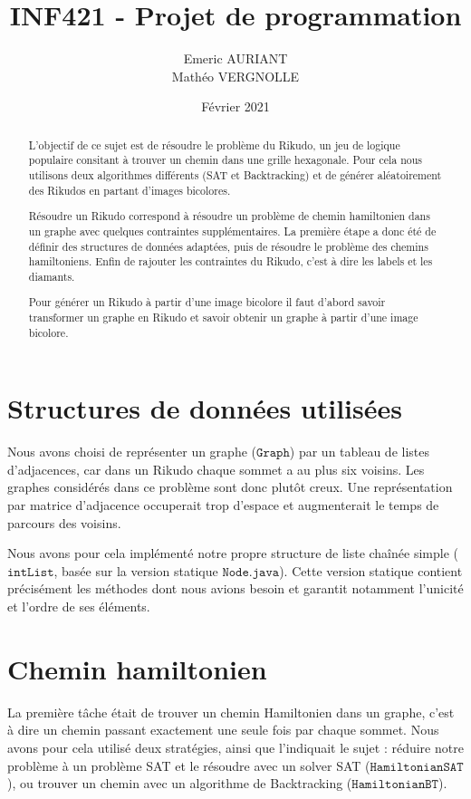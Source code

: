 \documentclass[11pt, a4paper]{article}
\author{Emeric \textsc{AURIANT} \\ Mathéo \textsc{VERGNOLLE}}
\title{INF421 - Projet de programmation}
\date{Février 2021}
\begin{document}
	
\maketitle

\begin{abstract}
	
L'objectif de ce sujet est de résoudre le problème du Rikudo, un jeu de logique populaire consitant à trouver un chemin dans une grille hexagonale. Pour cela nous utilisons deux algorithmes différents (SAT et Backtracking) et de générer aléatoirement des Rikudos en partant d'images bicolores. 

Résoudre un Rikudo correspond à résoudre un problème de chemin hamiltonien dans un graphe avec quelques contraintes supplémentaires. La première étape a donc été de définir des structures de données adaptées, puis de résoudre le problème des chemins hamiltoniens. Enfin de rajouter les contraintes du Rikudo, c'est à dire les labels et les diamants.

Pour générer un Rikudo à partir d'une image bicolore il faut d'abord savoir transformer un graphe en Rikudo et savoir obtenir un graphe à partir d'une image bicolore. 

\end{abstract}

\section{Structures de données utilisées}

Nous avons choisi de représenter un graphe ($\mathtt{Graph}$) par un tableau de listes d'adjacences, car dans un Rikudo chaque sommet a au plus six voisins. Les graphes considérés dans ce problème sont donc plutôt creux. Une représentation par matrice d'adjacence occuperait trop d'espace et augmenterait le temps de parcours des voisins.

Nous avons pour cela implémenté notre propre structure de liste chaînée simple ($\mathtt{intList}$, basée sur la version statique $\mathtt{Node.java}$). Cette version statique contient précisément les méthodes dont nous avions besoin et garantit notamment l'unicité et l'ordre de ses éléments.

\section{Chemin hamiltonien}

La première tâche était de trouver un chemin Hamiltonien dans un graphe, c'est à dire un chemin passant exactement une seule fois par chaque sommet. Nous avons pour cela utilisé deux stratégies, ainsi que l'indiquait le sujet : réduire notre problème à un problème SAT et le résoudre avec un solver SAT ($\mathtt{HamiltonianSAT}$), ou trouver un chemin avec un algorithme de Backtracking ($\mathtt{HamiltonianBT}$).
\end{document}
